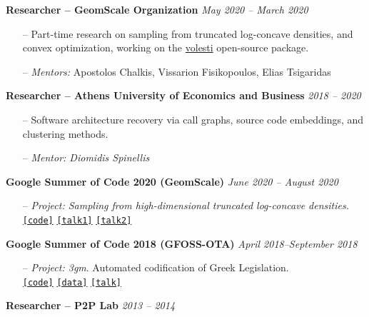 \documentclass[margin]{res}
\newcommand{\specialurl}[2]{\href {#2} {\texttt{[#1]}}}
\newcommand{\code}[1]{\specialurl {code} {#1}}
\newcommand{\data}[1]{\specialurl {data} {#1}}
\newcommand{\talk}[1]{\specialurl {talk} {#1}}
\begin{document}
\begin{resume}
\textbf{Researcher -- GeomScale Organization} \hfill \emph{May 2020 -- March 2020}

\begin{itemize}[nosep]
	\item[--] Part-time research on sampling from truncated log-concave densities, and convex optimization, working on the \href{https://github.com/GeomScale/volesti}{volesti} open-source package.
	\item[--] \emph{Mentors:} Apostolos Chalkis, Vissarion Fisikopoulos, Elias Tsigaridas
\end{itemize}


\textbf{Researcher -- Athens University of Economics and Business} \hfill \emph{2018 -- 2020}
\begin{itemize}[nosep]
\item[--] Software architecture recovery via call graphs, source code embeddings, and clustering methods.
\item[--] \emph{Mentor: Diomidis Spinellis}
\end{itemize}

\textbf{Google Summer of Code 2020 (GeomScale)}  \hfill \emph{June 2020 -- August 2020}
\begin{itemize}[nosep]
\item[--] \emph{Project: Sampling from high-dimensional truncated log-concave densities.} \\ \code{https://GeomScale/volesti} \specialurl{talk1}{https://www.youtube.com/watch?v=P7YfC8Nn6sY} \specialurl{talk2}{https://www.cs.utah.edu/~jeffp/WaGoML/index.html}
\end{itemize}

\textbf{Google Summer of Code 2018 (GFOSS-OTA)}  \hfill {\emph{April 2018--September 2018}}
\begin{itemize}[nosep]
\item[--] \emph{Project: 3gm}. Automated codification of Greek Legislation. \\ \code{https://github.com/eellak/gsoc2018-3gm} \data{https://archive.org/details/greekgovernmentgazette} \talk{https://www.youtube.com/watch?v=_UIGsy85Ehw}
\end{itemize}

\textbf{Researcher -- P2P Lab}  \hfill {\emph{2013 -- 2014}}




\end{resume}
\end{document}
